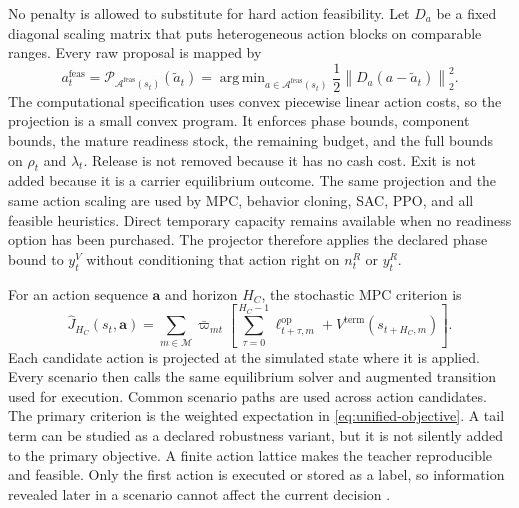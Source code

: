 \documentclass[a4paper,fleqn]{cas-sc}
\DeclareMathOperator*{\argmin}{arg\,min}
\newcommand{\norm}[1]{\left\lVert #1 \right\rVert}
\begin{document}
No penalty is allowed to substitute for hard action feasibility. Let $D_a$ be
a fixed diagonal scaling matrix that puts heterogeneous action blocks on
comparable ranges. Every raw proposal is mapped by
\begin{equation}
 a_t^{\mathrm{feas}}
 =\mathcal P_{\mathcal A^{\mathrm{feas}}(s_t)}(\widetilde a_t)
 =\argmin_{a\in\mathcal A^{\mathrm{feas}}(s_t)}
 \frac12\norm{D_a(a-\widetilde a_t)}_2^2.
 \label{eq:action-projection}
\end{equation}
The computational specification uses convex piecewise linear action costs, so
the projection is a small convex program. It enforces phase bounds, component
bounds, the mature readiness stock, the remaining budget, and the full bounds
on $\rho_t$ and $\lambda_t$. Release is not removed because it has no cash
cost. Exit is not added because it is a carrier equilibrium outcome. The same
projection and the same action scaling are used by MPC, behavior cloning, SAC,
PPO, and all feasible heuristics.
Direct temporary capacity remains available when no readiness option has been
purchased. The projector therefore applies the declared phase bound to $y_t^V$
without conditioning that action right on $n_t^R$ or $y_t^R$.

For an action sequence $\mathbf a$ and horizon $H_C$, the stochastic MPC
criterion is
\begin{equation}
 \widehat J_{H_C}(s_t,\mathbf a)
 =\sum_{m\in\mathcal M}\bar\varpi_{mt}
 \left[
 \sum_{\tau=0}^{H_C-1}
 \ell^{\mathrm{op}}_{t+\tau,m}
 +V^{\mathrm{term}}(s_{t+H_C,m})
 \right].
 \label{eq:mpc-objective}
\end{equation}
Each candidate action is projected at the simulated state where it is applied.
Every scenario then calls the same equilibrium solver and augmented transition
used for execution. Common scenario paths are used across action candidates.
The primary criterion is the weighted expectation in
\cref{eq:unified-objective}. A tail term can be studied as a declared
robustness variant, but it is not silently added to the primary objective. A
finite action lattice makes the teacher reproducible and feasible. Only the
first action is executed or stored as a label, so information revealed later
in a scenario cannot affect the current decision
\citep{PeetaMahmassani1995,JiangTranKeyvanEkbatani2024}.
\end{document}
